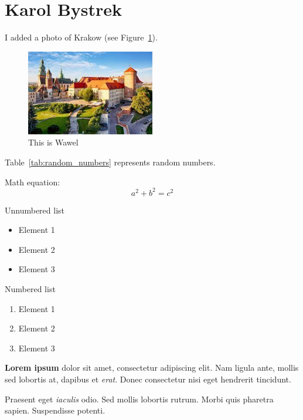 \section{Karol Bystrek}
\label{sec:krlbstrk}

I added a photo of Krakow (see Figure~\ref{fig:krakow}).

\begin{figure}[htbp]
    \centering
    \includegraphics[width=0.5\textwidth]{pictures/krakow.jpeg}
    \caption{This is Wawel}
    \label{fig:krakow}
\end{figure}

Table~\ref{tab:random_numbers} represents random numbers.



Math equation: \[a^2 + b^2 = c^2\]

Unnumbered list
\begin{itemize}
  \item Element 1
  \item Element 2
  \item Element 3
\end{itemize}

Numbered list
\begin{enumerate}
  \item Element 1
  \item Element 2
  \item Element 3
\end{enumerate}

\vspace{1.5cm}
\textbf{Lorem ipsum} dolor sit amet, consectetur adipiscing elit. Nam ligula ante, mollis sed lobortis at, dapibus et \emph{erat}. Donec consectetur nisi eget hendrerit tincidunt.

Praesent eget \textit{iaculis} odio. Sed mollis lobortis rutrum. Morbi quis pharetra sapien. Suspendisse potenti.